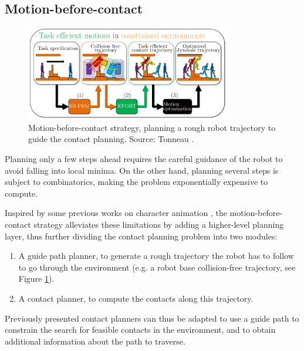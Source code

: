 \subsection{Motion-before-contact\label{subsub:motion_before_contact}}
\begin{figure}[h]
    \centering
    \includegraphics[width=0.8\textwidth]{Figures/Chapter_SOTA//diagram_steve_thesis.png}
    \caption{Motion-before-contact strategy, planning a rough robot trajectory to guide the contact planning. Source: Tonneau \cite{thesis_steve}.}
    \label{fig:cp_mbc}
\end{figure}

Planning only a few steps ahead requires the careful guidance of the robot to avoid falling into local minima.
On the other hand, planning several steps is subject to combinatorics, making the problem exponentially expensive to compute.

Inspired by some previous works on character animation \cite{thesis_kuffner_1999, pettre_2_stages_2003}, the motion-before-contact strategy alleviates these limitations by adding a higher-level planning layer, thus further dividing the contact planning problem into two modules:
\begin{enumerate}
    \item A guide path planner, to generate a rough trajectory the robot has to follow to go through the environment (e.g. a robot base collision-free trajectory, see Figure \ref{fig:cp_mbc}).
    \item A contact planner, to compute the contacts along this trajectory.
\end{enumerate}
Previously presented contact planners can thus be adapted to use a guide path to constrain the search for feasible contacts in the environment, and to obtain additional information about the path to traverse.


